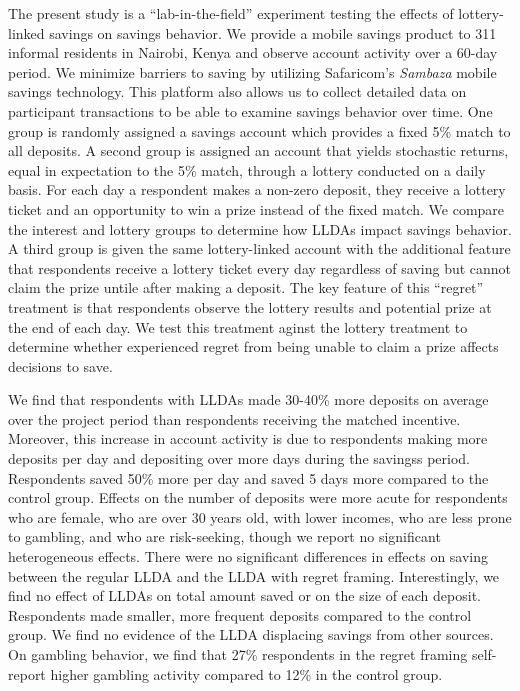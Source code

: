 \documentclass[10pt]{article}
\begin{document}
	The present study is a ``lab-in-the-field'' experiment testing the effects of lottery-linked savings on savings behavior. We provide a mobile savings product to 311 informal residents in Nairobi, Kenya and observe account activity over a 60-day period. We minimize barriers to saving by utilizing Safaricom's \textit{Sambaza} mobile savings technology. This platform also allows us to collect detailed data on participant transactions to be able to examine savings behavior over time. One group is randomly assigned a savings account which provides a fixed 5\% match to all deposits. A second group is assigned an account that yields stochastic returns, equal in expectation to the 5\% match, through a lottery conducted on a daily basis. For each day a respondent makes a non-zero deposit, they receive a lottery ticket and an opportunity to win a prize instead of the fixed match. We compare the interest and lottery groups to determine how LLDAs impact savings behavior. A third group is given the same lottery-linked account with the additional feature that respondents receive a lottery ticket every day regardless of saving but cannot claim the prize untile after making a deposit. The key feature of this ``regret'' treatment is that respondents observe the lottery results and potential prize at the end of each day. We test this treatment aginst the lottery treatment to determine whether experienced regret from being unable to claim a prize affects decisions to save.

	We find that respondents with LLDAs made 30-40\% more deposits on average over the project period than respondents receiving the matched incentive. Moreover, this increase in account activity is due to respondents making more deposits per day and depositing over more days during the savingss period. Respondents saved 50\% more per day and saved 5 days more compared to the control group. Effects on the number of deposits were more acute for respondents who are female, who are over 30 years old, with lower incomes, who are less prone to gambling, and who are risk-seeking, though we report no significant heterogeneous effects. There were no significant differences in effects on saving between the regular LLDA and the LLDA with regret framing. Interestingly, we find no effect of LLDAs on total amount saved or on the size of each deposit. Respondents made smaller, more frequent deposits compared to the control group. We find no evidence of the LLDA displacing savings from other sources. On gambling behavior, we find that 27\% respondents in the regret framing self-report higher gambling activity compared to 12\% in the control group.
\end{document}
